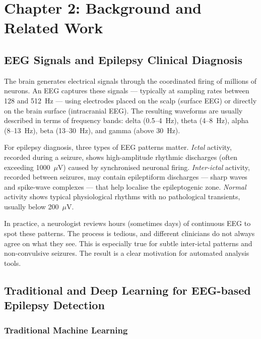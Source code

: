 \section*{Chapter 2: Background and Related Work}
\setcounter{section}{2} \setcounter{subsection}{0}
 {}

\subsection{EEG Signals and Epilepsy Clinical Diagnosis}

The brain generates electrical signals through the coordinated firing of millions of neurons. An EEG captures these signals --- typically at sampling rates between 128 and 512~Hz --- using electrodes placed on the scalp (surface EEG) or directly on the brain surface (intracranial EEG). The resulting waveforms are usually described in terms of frequency bands: delta (0.5--4~Hz), theta (4--8~Hz), alpha (8--13~Hz), beta (13--30~Hz), and gamma (above 30~Hz).

For epilepsy diagnosis, three types of EEG patterns matter. \textit{Ictal} activity, recorded during a seizure, shows high-amplitude rhythmic discharges (often exceeding 1000~$\mu$V) caused by synchronised neuronal firing. \textit{Inter-ictal} activity, recorded between seizures, may contain epileptiform discharges --- sharp waves and spike-wave complexes --- that help localise the epileptogenic zone. \textit{Normal} activity shows typical physiological rhythms with no pathological transients, usually below 200~$\mu$V.

In practice, a neurologist reviews hours (sometimes days) of continuous EEG to spot these patterns. The process is tedious, and different clinicians do not always agree on what they see. This is especially true for subtle inter-ictal patterns and non-convulsive seizures. The result is a clear motivation for automated analysis tools.

\subsection{Traditional and Deep Learning for EEG-based Epilepsy Detection}

\subsubsection{Traditional Machine Learning}

